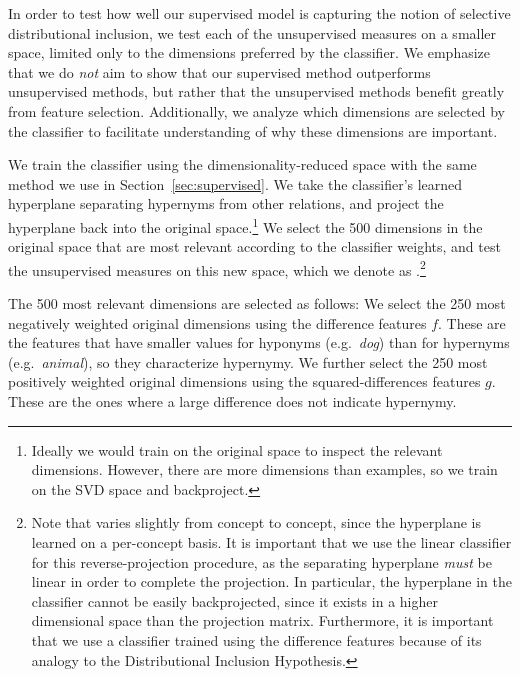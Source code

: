 \documentclass[letterpaper]{article}
\begin{document}




In order to test how well our supervised model is capturing the notion
of selective distributional inclusion, we test each of the unsupervised
measures on a smaller space, limited only to the dimensions preferred by
the classifier. We emphasize that we do {\em not} aim to show that our
supervised method outperforms unsupervised methods, but rather
that the unsupervised methods benefit greatly from feature selection.
Additionally, we analyze  which dimensions are selected by
the classifier to facilitate understanding of why these dimensions are
important.

We train the {\logreg} classifier using the dimensionality-reduced {\UpWWr} space with the
same method we use in Section~\ref{sec:supervised}.
We take the classifier's learned
hyperplane separating hypernyms from other relations, and project
the hyperplane back into the original {\UpWW} space.\footnote{Ideally
  we would train on the original space to
  inspect the relevant dimensions. However, there are more dimensions than examples,
  so we train on the SVD space and backproject.}
We select the 500 dimensions in the original space that are most
relevant according to the classifier weights, and
test the unsupervised measures on this new space, which we denote as
{\UpWWu}.\footnote{
Note that
{\UpWWu} varies slightly from concept to concept, since the hyperplane is
learned on a per-concept basis.
It is important that we use the linear {\logreg} classifier for this
reverse-projection procedure, as the separating hyperplane {\em must} be linear
in order to complete the projection. In particular, the hyperplane in the
{\svm} classifier cannot be easily backprojected, since it exists in a higher
dimensional space than the projection matrix.
Furthermore, it is
important that we use a classifier trained using the difference features because of
its analogy to the Distributional Inclusion Hypothesis.}

The 500  most relevant dimensions are selected as follows:
We select the 250 most negatively weighted original
dimensions using the difference features $f$. 
These are the features that have smaller values for hyponyms
(e.g.\ \textit{dog}) than for hypernyms  (e.g.\
\textit{animal}), so they characterize hypernymy.
We further select the 250 most positively weighted
original dimensions using the squared-differences features $g$. These
are the ones where a large difference does not indicate hypernymy. 
\end{document}
